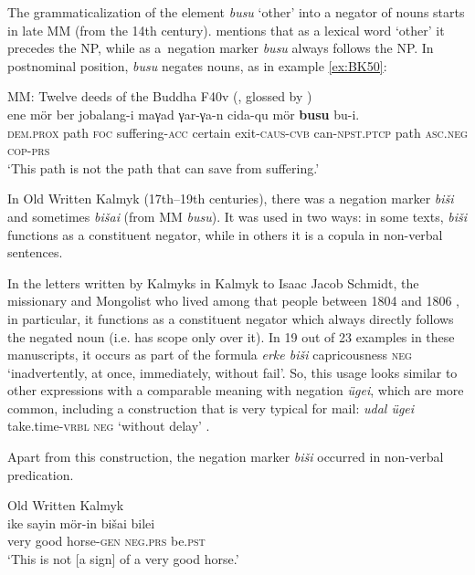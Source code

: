 \documentclass[output=paper]{langsci/langscibook}
\begin{document}
The grammaticalization of the element \textit{busu} ‘other’ into a negator of nouns starts in late MM (from the 14th century). \citet[127]{yu1991a} mentions that as a lexical word ‘other’ it precedes the NP, while as a negation marker \textit{busu} always follows the NP. In postnominal position, \textit{busu} negates nouns, as in example \ref{ex:BK50}:

\ea MM: Twelve deeds of the Buddha F40v (\citep[49, 141]{bawden_1969}, glossed by \citealp[105]{brosig2015a}) \label{ex:BK50}\\
	\gll ene				mör	ber	jobalang-i		maγad	γar-γa-n			cida-qu			mör	\textbf{busu}			bu-i.\\
	\textsc{dem.prox}	path	\textsc{foc}	suffering-\textsc{acc}	certain	exit-\textsc{caus-cvb}	can-\textsc{npst.ptcp}	path	\textsc{asc.neg}		\textsc{cop-prs}\\
	\glt `This path is not the path that can save from suffering.'
\z

In Old Written Kalmyk (17th–19th centuries), there was a negation marker \textit{biši} and sometimes \textit{bišai} (from MM \textit{busu}). It was used in two ways: in some texts, \textit{biši} functions as a constituent negator, while in others it is a copula in non-verbal sentences.

In the letters written by Kalmyks in Kalmyk to Isaac Jacob Schmidt, the missionary and Mongolist who lived among that people between 1804 and 1806 \citep{krueger2002a}, in particular, it functions as a constituent negator which always directly follows the negated noun (i.e. has scope only over it). In 19 out of 23 examples in these manuscripts, it occurs as part of the formula \textit{erke biši} capricousness \textsc{neg} ‘inadvertently, at once, immediately, without fail’. So, this usage looks similar to other expressions with a comparable meaning with negation \textit{ügei}, which are more common, including a construction that is very typical for mail: \textit{udal ügei} take.time-\textsc{vrbl neg} ‘without delay’ \citep[57]{krueger2002a}.

Apart from this construction, the negation marker \textit{biši} occurred in non-verbal predication.

\ea Old Written Kalmyk \citep[27, Letter 9, lines 7–8]{krueger2002a} \label{ex:BK51}\\
	\gll ike		sayin		mör-in		bišai		bilei\\
	very	good		horse-\textsc{gen}	\textsc{neg.prs}	be.\textsc{pst}\\
	\glt `This is not [a sign] of a very good horse.'
\z
\end{document}
